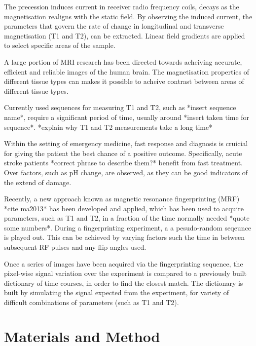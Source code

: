\documentclass[review]{elsarticle}
\begin{document}
The precession induces current in receiver radio frequency coils, decays as the magnetisation realigns with the static field. By observing the induced current, the parameters that govern the rate of change in longitudinal and transverse magnetisation (T1 and T2), can be extracted. Linear field gradients are applied to select specific areas of the sample. 


A large portion of MRI research has been directed towards acheiving accurate, efficient and reliable images of the human brain.  The magnetisation properties of different tissue types can makes it possible to acheive contrast between areas of different tissue types.

Currently used sequences for measuring T1 and T2, such as *insert sequence name*, require a significant period of time, usually around *insert taken time for sequence*.  *explain why T1 and T2 measurements take a long time* 

Within the setting of emergency medicine, fast response and diagnosis is cruicial for giving the patient the best chance of a positive outcome. Specifically, acute stroke patients *correct phrase to describe them?* benefit from fast treatment. Over factors, such as pH change, are observed, as they can be good indicators of the extend of damage.

Recently, a new approach known as magnetic resonance fingerprinting (MRF) *cite ma2013* has been developed and applied, which has been used to acquire parameters, such as T1 and T2, in a fraction of the time normally needed *quote some numbers*. During a fingerprinting experiment, a a pesudo-random seqeunce is played out. This can be achieved by varying factors such the time in between subsequent RF pulses and any flip angles used.

Once a series of images have been acquired via the fingerprinting sequence, the pixel-wise signal variation over the experiment is compared to a previously built dictionary of time courses, in order to find the closest match. The dictionary is built by simulating the signal expected from the experiment, for variety of difficult combinations of parameters (such as T1 and T2). 


\section{Materials and Method}
\end{document}
